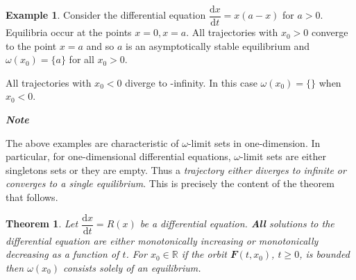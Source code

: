 \documentclass[
  a4paper,
  oneside,
  final]{krantz}
\newcommand{\R}{\mathbb{R}}
\renewcommand{\d}{\mathrm{d}}
\renewcommand{\v}[1]{{\mathbfit{#1}}}
\newcommand{\der}[2]{\dfrac{\d #1}{\d #2}}
\newtheorem{theorem}{Theorem}[chapter]
\theoremstyle{definition}
\theoremstyle{definition}
\newtheorem{example}{Example}[chapter]
\theoremstyle{definition}
\theoremstyle{definition}
\theoremstyle{remark}
\begin{document}
\begin{example}
Consider the differential equation \(\der{x}{t} = x (a -x)\) for \(a>0\). Equilibria occur at the points \(x=0, x= a\). All trajectories with \(x_{0} >0\) converge to the point \(x =a\) and so \(a\) is an asymptotically stable equilibrium and \(\omega(x_0) = \{a\}\) for all \(x_0 >0\).

All trajectories with \(x_0 <0\) diverge to -infinity. In this case \(\omega(x_0) = \{\}\) when \(x_0 <0\).
\end{example}

\begin{palegreenbox}

\begin{center}
\textbf{\emph{Note}}

\end{center}

The above examples are characteristic of \(\omega\)-limit sets in one-dimension. In particular, for one-dimensional differential equations, \(\omega\)-limit sets are either singletons sets or they are empty. Thus a \emph{trajectory either diverges to infinite or converges to a single equilibrium}. This is precisely the content of the theorem that follows.

\end{palegreenbox}

\begin{theorem}
\protect\hypertarget{thm:omega-limit-sets-1D}{}\label{thm:omega-limit-sets-1D}Let \(\der{x}{t} = R(x)\) be a differential equation. \textbf{All} solutions to the differential equation are either monotonically increasing or monotonically decreasing as a function of \(t\). For \(x_0 \in \R\) if the orbit \(\v{F}(t, x_0)\), \(t \ge 0\), is bounded then \(\omega(x_0)\) consists solely of an equilibrium.
\end{theorem}
\end{document}
